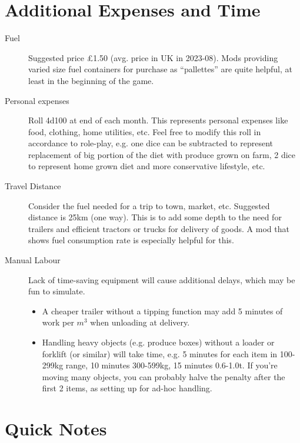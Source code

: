 \documentclass[a4paper,10pt]{article}
\begin{document}
\section{Additional Expenses and Time}
\begin{description}
\item[Fuel] Suggested price \pounds{}1.50 (avg. price in UK in 2023-08). Mods
  providing varied size fuel containers for purchase as ``pallettes'' are quite
  helpful, at least in the beginning of the game.
\item[Personal expenses] Roll 4d100 at end of each month. This represents
  personal expenses like food, clothing, home utilities, etc. Feel free to
  modify this roll in accordance to role-play, e.g. one dice can be subtracted
  to represent replacement of big portion of the diet with produce grown on
  farm, 2 dice to represent home grown diet and more conservative lifestyle,
  etc.
\item[Travel Distance] Consider the fuel needed for a trip to town, market, etc.
  Suggested distance is 25km (one way). This is to add some depth to the need
  for trailers and efficient tractors or trucks for delivery of goods. A mod
  that shows fuel consumption rate is especially helpful for this.
\item[Manual Labour] Lack of time-saving equipment will cause additional delays,
  which may be fun to simulate.
  \begin{itemize}
  \item A cheaper trailer without a tipping function may add 5 minutes of work
    per $m^3$ when unloading at delivery.
  \item Handling heavy objects (e.g. produce boxes) without a loader or forklift
    (or similar) will take time, e.g. 5 minutes for each item in 100-299kg
    range, 10 minutes 300-599kg, 15 minutes 0.6-1.0t. If you're moving many
    objects, you can probably halve the penalty after the first 2 items, as
    setting up for ad-hoc handling.
  \end{itemize}
\end{description}

\section{Quick Notes}
\end{document}
